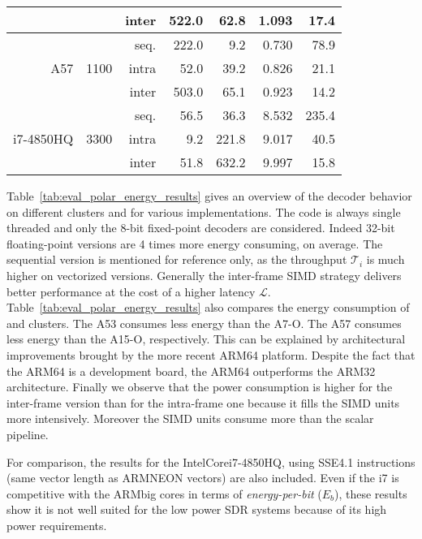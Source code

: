 \begin{table}[htp]
\begin{tabular}{r r r r r r r}
                               &                       & inter &  522.0 &  62.8 & 1.093 &  17.4 \\
    \hline
    \multirow{3}{*}{A57}       & \multirow{3}{*}{1100} & seq.  &  222.0 &   9.2 & 0.730 &  78.9 \\
                               &                       & intra &   52.0 &  39.2 & 0.826 &  21.1 \\
                               &                       & inter &  503.0 &  65.1 & 0.923 &  14.2 \\
    \hline
    \multirow{3}{*}{i7-4850HQ} & \multirow{3}{*}{3300} & seq.  &   56.5 &  36.3 & 8.532 & 235.4 \\
                               &                       & intra &    9.2 & 221.8 & 9.017 &  40.5 \\
                               &                       & inter &   51.8 & 632.2 & 9.997 &  15.8 \\
  \end{tabular}
\end{table}

Table~\ref{tab:eval_polar_energy_results} gives an overview of the decoder
behavior on different clusters and for various implementations. The code is
always single threaded and only the 8-bit fixed-point decoders are considered.
Indeed 32-bit floating-point versions are 4 times more energy consuming, on
average. The sequential version is mentioned for reference only, as the
throughput $\mathcal{T}_i$ is much higher on vectorized versions. Generally the
inter-frame SIMD strategy delivers better performance at the cost of a higher
latency $\mathcal{L}$. Table~\ref{tab:eval_polar_energy_results} also compares
the energy consumption of \little and \bigARM clusters. The A53 consumes less
energy than the A7-O. The A57 consumes less energy than the A15-O, respectively.
This can be explained by architectural improvements brought by the more recent
ARM64 platform. Despite the fact that the ARM64 is a development board, the
ARM64 outperforms the ARM32 architecture. Finally we observe that the power
consumption is higher for the inter-frame version than for the intra-frame one
because it fills the SIMD units more intensively. Moreover the SIMD units
consume more than the scalar pipeline.

For comparison, the results for the Intel\R Core\TM i7-4850HQ, using SSE4.1
instructions (same vector length as ARM\R NEON vectors) are also included. Even
if the i7 is competitive with the ARM\R big cores in terms of
\textit{energy-per-bit} ($E_b$), these results show it is not well suited for
the low power SDR systems because of its high power requirements.

